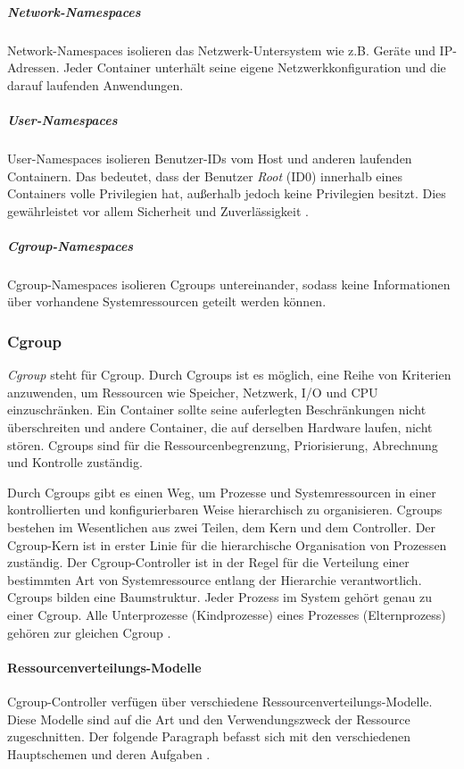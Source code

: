\subparagraph{Network-Namespaces} Network-Namespaces isolieren das Netzwerk-Untersystem wie z.B. Geräte und IP-Adressen. Jeder Container unterhält seine eigene Netzwerkkonfiguration und die darauf laufenden Anwendungen.

\subparagraph{User-Namespaces} User-Namespaces isolieren Benutzer-IDs vom Host und anderen laufenden Containern. Das bedeutet, dass der Benutzer \emph{Root} (ID0) innerhalb eines Containers volle Privilegien hat, außerhalb jedoch keine Privilegien besitzt. Dies gewährleistet vor allem Sicherheit und Zuverlässigkeit \cite{Xavier2015AClouds}.

\subparagraph{Cgroup-Namespaces} Cgroup-Namespaces isolieren Cgroups untereinander, sodass keine Informationen über vorhandene Systemressourcen geteilt werden können.



\subsubsection{Cgroup}
\emph{Cgroup} steht für \ac{Cgroup}. Durch Cgroups ist es möglich, eine Reihe von Kriterien anzuwenden, um Ressourcen wie Speicher, Netzwerk, I/O und CPU einzuschränken. Ein Container sollte seine auferlegten Beschränkungen nicht überschreiten und andere Container, die auf derselben Hardware laufen, nicht stören. Cgroups sind für die Ressourcenbegrenzung, Priorisierung, Abrechnung und Kontrolle zuständig.

Durch Cgroups gibt es einen Weg, um Prozesse und Systemressourcen in einer kontrollierten und konfigurierbaren Weise hierarchisch zu organisieren. Cgroups bestehen im Wesentlichen aus zwei Teilen, dem Kern und dem Controller. Der Cgroup-Kern ist in erster Linie für die hierarchische Organisation von Prozessen zuständig. Der Cgroup-Controller ist in der Regel für die Verteilung einer bestimmten Art von Systemressource entlang der Hierarchie verantwortlich. Cgroups bilden eine Baumstruktur. Jeder Prozess im System gehört genau zu einer Cgroup. Alle Unterprozesse (Kindprozesse) eines Prozesses (Elternprozess) gehören zur gleichen Cgroup \cite{Heo2015ControlV2}. 


\paragraph{Ressourcenverteilungs-Modelle}
Cgroup-Controller verfügen über verschiedene Ressourcenverteilungs-Modelle. Diese Modelle sind auf die Art und den Verwendungszweck der Ressource zugeschnitten. Der folgende Paragraph befasst sich mit den verschiedenen Hauptschemen und deren Aufgaben \cite{Heo2015ControlV2}.


